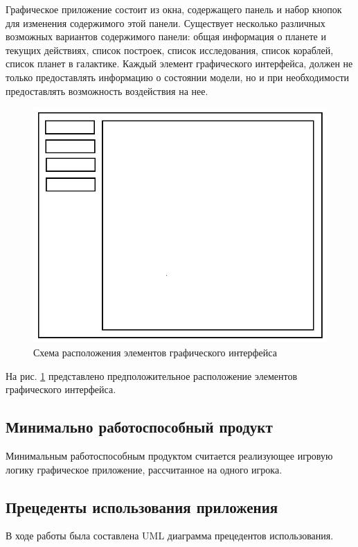 Графическое приложение состоит из окна, содержащего панель и набор кнопок для изменения содержимого этой панели. Существует несколько различных возможных вариантов содержимого панели: общая информация о планете и текущих действиях, список построек, список исследования, список кораблей, список планет в галактике. Каждый элемент графического интерфейса, должен не только предоставлять информацию о состоянии модели, но и при необходимости предоставлять возможность воздействия на нее.

\begin{figure}[H]
\centering
\includegraphics[scale=0.5]{sc.jpg}
\caption{Схема расположения элементов графического интерфейса}
\label{sc}
\end{figure}

На рис. \ref{sc} представлено предположительное расположение элементов графического интерфейса.

\subsection{Минимально работоспособный продукт}
Минимальным работоспособным продуктом считается реализующее игровую логику графическое приложение, рассчитанное на одного игрока.

\subsection{Прецеденты использования приложения}

В ходе работы была составлена UML диаграмма прецедентов использования.

